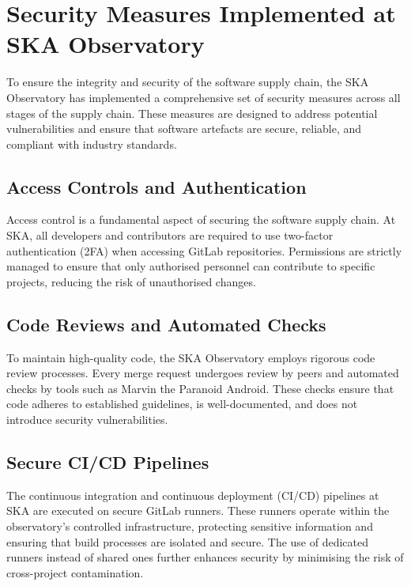 \documentclass[a4paper]{spie}  %
\begin{document}
\section{Security Measures Implemented at SKA Observatory}

To ensure the integrity and security of the software supply chain, the SKA Observatory has implemented a comprehensive set of security measures across all stages of the supply chain. These measures are designed to address potential vulnerabilities and ensure that software artefacts are secure, reliable, and compliant with industry standards.

\subsection{Access Controls and Authentication}

Access control is a fundamental aspect of securing the software supply chain. At SKA, all developers and contributors are required to use two-factor authentication (2FA) when accessing GitLab repositories. Permissions are strictly managed to ensure that only authorised personnel can contribute to specific projects, reducing the risk of unauthorised changes.

\subsection{Code Reviews and Automated Checks}

To maintain high-quality code, the SKA Observatory employs rigorous code review processes. Every merge request undergoes review by peers and automated checks by tools such as Marvin the Paranoid Android. These checks ensure that code adheres to established guidelines, is well-documented, and does not introduce security vulnerabilities.

\subsection{Secure CI/CD Pipelines}

The continuous integration and continuous deployment (CI/CD) pipelines at SKA are executed on secure GitLab runners. These runners operate within the observatory's controlled infrastructure, protecting sensitive information and ensuring that build processes are isolated and secure. The use of dedicated runners instead of shared ones further enhances security by minimising the risk of cross-project contamination.
\end{document}
